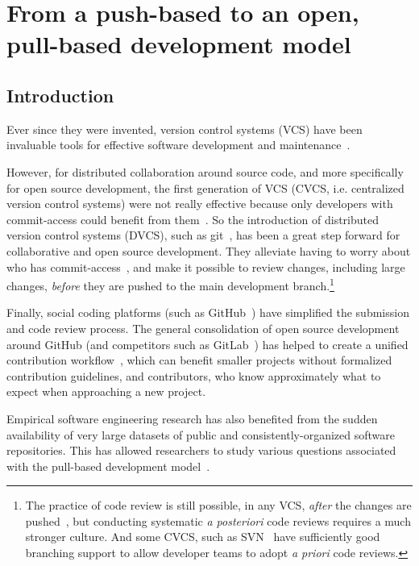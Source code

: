 \chapter{From a push-based to an open, pull-based development model}

\label{chap:pull-based-development}

\section{Introduction}

Ever since they were invented, version control systems (VCS) have been invaluable tools for effective software development and maintenance~\cite{spinellis2005vcs}.

However, for distributed collaboration around source code, and more specifically for open source development, the first generation of VCS (CVCS, i.e. centralized version control systems) were not really effective because only developers with commit-access could benefit from them~\cite{de2009software,rodriguez2012distributed}.
So the introduction of distributed version control systems (DVCS), such as git~\cite{torvalds2005git}, has been a great step forward for collaborative and open source development.
They alleviate having to worry about who has commit-access~\cite{torvalds2007git}, and make it possible to review changes, including large changes, \emph{before} they are pushed to the main development branch.\footnote{
	The practice of code review is still possible, in any VCS, \emph{after} the changes are pushed~\cite[Chapter 2]{fogel2005producing}, but conducting systematic \emph{a posteriori} code reviews requires a much stronger culture.
	And some CVCS, such as SVN~\cite{svn} have sufficiently good branching support to allow developer teams to adopt \emph{a priori} code reviews.
}

Finally, social coding platforms (such as GitHub~\cite{github}) have simplified the submission and code review process.
The general consolidation of open source development around GitHub (and competitors such as GitLab~\cite{gitlab}) has helped to create a unified contribution workflow~\cite{opensourceguide}, which can benefit smaller projects without formalized contribution guidelines, and contributors, who know approximately what to expect when approaching a new project.

Empirical software engineering research has also benefited from the sudden availability of very large datasets of public and consistently-organized software repositories.
This has allowed researchers to study various questions associated with the pull-based development model~\cite{cosentino2017systematic}.

